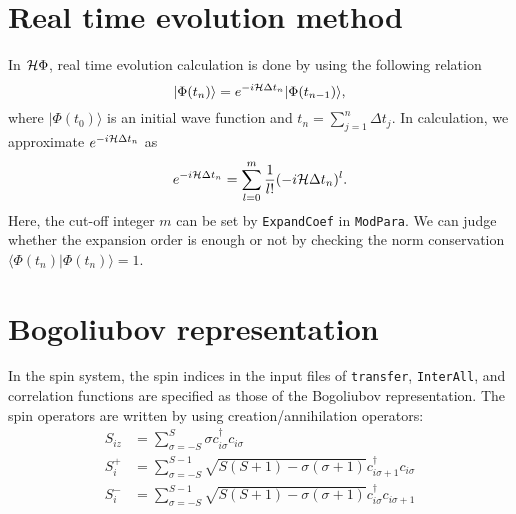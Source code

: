 \section{{Real time evolution method}}
\label{Ch:TE}
In ${\cal H}\Phi$, real time evolution calculation is done by using the following relation
\begin{equation}
|\Phi (t_n)\rangle = e^{-i {\cal H}  \Delta t_n}|\Phi (t_{n-1})\rangle,
\end{equation}
where $|\Phi(t_0)\rangle$ is an initial wave function and $t_n = \sum_{j=1}^n  \Delta t_j $.
In calculation, we approximate $e^{-i {\cal H}  \Delta t_n}$ as
\begin{equation}
e^{-i {\cal H}  \Delta t_n} =\sum_{l=0}^m \frac{1}{l!}(-i {\cal H}  \Delta t_n)^l .
\end{equation}
Here, the cut-off integer $m$ can be set by \verb|ExpandCoef| in \verb|ModPara|.
We can judge whether the expansion order is enough or not by checking the norm conservation $\langle \Phi (t_n)|\Phi (t_n)\rangle=1$.

\section{Bogoliubov representation}\label{sec_bogoliubov_rep}

In the spin system,
the spin indices in the input files of \verb|transfer|, \verb|InterAll|,
and correlation functions are specified as those of the Bogoliubov representation.
The spin operators are written by using creation/annihilation operators:
\begin{align}
  S_{i z} &= \sum_{\sigma = -S}^{S} \sigma c_{i \sigma}^\dagger c_{i \sigma}
  \\
  S_{i}^+ &= \sum_{\sigma = -S}^{S-1} 
  \sqrt{S(S+1) - \sigma(\sigma+1)} 
  c_{i \sigma+1}^\dagger c_{i \sigma}
  \\
  S_{i}^- &= \sum_{\sigma = -S}^{S-1} 
  \sqrt{S(S+1) - \sigma(\sigma+1)} 
  c_{i \sigma}^\dagger c_{i \sigma+1}
\end{align}


